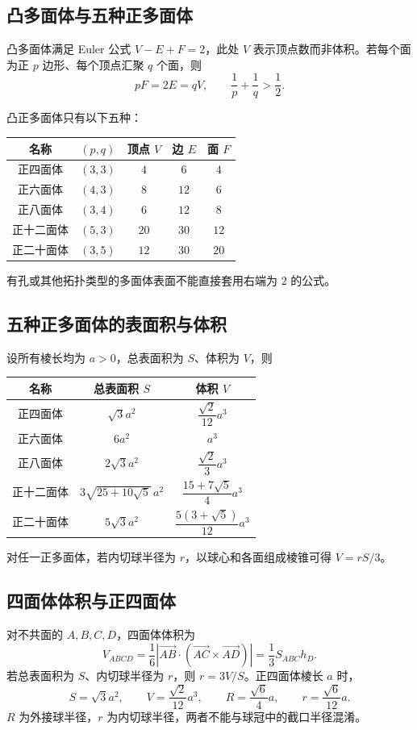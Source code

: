 \documentclass[../main.tex]{subfiles}
\begin{document}
\subsection{凸多面体与五种正多面体}
凸多面体满足 Euler 公式 $V-E+F=2$，此处 $V$ 表示顶点数而非体积。若每个面为正 $p$ 边形、每个顶点汇聚 $q$ 个面，则
\[
pF=2E=qV,\qquad\frac1p+\frac1q>\frac12.
\]
\par\begin{samepage}
凸正多面体只有以下五种：
\begin{center}
\begin{tabular}{c|c|c|c|c}
名称 & $(p,q)$ & 顶点 $V$ & 边 $E$ & 面 $F$\\\hline
正四面体 & $(3,3)$ & $4$ & $6$ & $4$\\
正六面体 & $(4,3)$ & $8$ & $12$ & $6$\\
正八面体 & $(3,4)$ & $6$ & $12$ & $8$\\
正十二面体 & $(5,3)$ & $20$ & $30$ & $12$\\
正二十面体 & $(3,5)$ & $12$ & $30$ & $20$
\end{tabular}
\end{center}
有孔或其他拓扑类型的多面体表面不能直接套用右端为 $2$ 的公式。
\par\end{samepage}
\subsection{五种正多面体的表面积与体积}
设所有棱长均为 $a>0$，总表面积为 $S$、体积为 $V$，则
\begin{center}
\renewcommand{\arraystretch}{1.6}
\begin{tabular}{c|c|c}
名称 & 总表面积 $S$ & 体积 $V$\\\hline
正四面体 & $\sqrt3a^2$ & $\dfrac{\sqrt2}{12}a^3$\\
正六面体 & $6a^2$ & $a^3$\\
正八面体 & $2\sqrt3a^2$ & $\dfrac{\sqrt2}{3}a^3$\\
正十二面体 & $3\sqrt{25+10\sqrt5}\,a^2$ & $\dfrac{15+7\sqrt5}{4}a^3$\\
正二十面体 & $5\sqrt3a^2$ & $\dfrac{5(3+\sqrt5)}{12}a^3$
\end{tabular}
\end{center}
对任一正多面体，若内切球半径为 $r$，以球心和各面组成棱锥可得 $V=rS/3$。
\subsection{四面体体积与正四面体}
对不共面的 $A,B,C,D$，四面体体积为
\[
V_{ABCD}=\frac16|\overrightarrow{AB}\cdot(\overrightarrow{AC}\times\overrightarrow{AD})|
=\frac13S_{ABC}h_D.
\]
若总表面积为 $S$、内切球半径为 $r$，则 $r=3V/S$。正四面体棱长 $a$ 时，
\[
S=\sqrt3a^2,\qquad V=\frac{\sqrt2}{12}a^3,\qquad
R=\frac{\sqrt6}4a,\qquad r=\frac{\sqrt6}{12}a.
\]
$R$ 为外接球半径，$r$ 为内切球半径，两者不能与球冠中的截口半径混淆。
\end{document}
